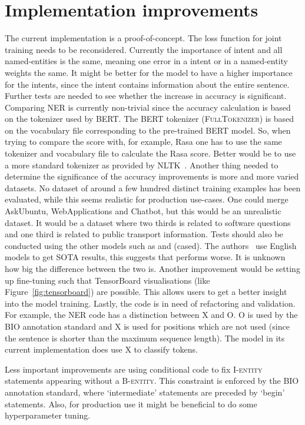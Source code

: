 \section{Implementation improvements}
\label{sec:implementation_improvements}
The current implementation is a proof-of-concept.
The loss function for joint training needs to be reconsidered.
Currently the importance of intent and all named-entities is the same, meaning one error in a intent or in a named-entity weights the same.
It might be better for the model to have a higher importance for the intents, since the intent contains information about the entire sentence.
Further tests are needed to see whether the increase in accuracy is significant.
Comparing NER is currently non-trivial since the accuracy calculation is based on the tokenizer used by BERT.
The BERT tokenizer (\textsc{FullTokenizer}) is based on the vocabulary file corresponding to the pre-trained BERT model.
So, when trying to compare the score with, for example, Rasa one has to use the same tokenizer and vocabulary file to calculate the Rasa score.
Better would be to use a more standard tokenizer as provided by NLTK~\citep{bird2004nltk}.
Another thing needed to determine the significance of the accuracy improvements is more and more varied datasets.
No dataset of around a few hundred distinct training examples has been evaluated, while this seems realistic for production use-cases.
One could merge AskUbuntu, WebApplications and Chatbot, but this would be an unrealistic dataset.
It would be a dataset where two thirds is related to software questions and one third is related to public transport information.
Tests should also be conducted using the other models such as  and  (cased).
The authors~\citep{devlin2018} use English models to get SOTA results, this suggests that  performs worse.
It is unknown how big the difference between the two is.
Another improvement would be setting up fine-tuning such that TensorBoard visualisations (like Figure~\ref{fig:tensorboard}) are possible.
This allows users to get a better insight into the model training.
Lastly, the code is in need of refactoring and validation.
For example, the NER code has a distinction between X and O.
O is used by the BIO annotation standard and X is used for positions which are not used (since the sentence is shorter than the maximum sequence length).
The model in its current implementation does use X to classify tokens.

Less important improvements are using conditional code to fix I-\textsc{entity} statements appearing without a B-\textsc{entity}.
This constraint is enforced by the BIO annotation standard, where `intermediate' statements are preceded by `begin' statements.
Also, for production use it might be beneficial to do some hyperparameter tuning.


